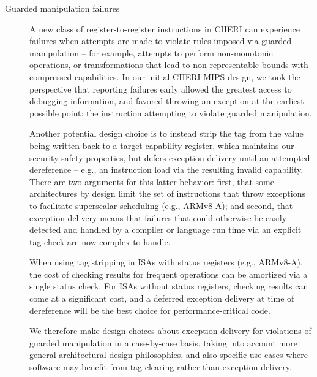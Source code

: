 \begin{description}
\item[Guarded manipulation failures]
  A new class of register-to-register instructions in CHERI can experience
  failures when attempts are made to violate rules imposed via guarded
  manipulation -- for example, attempts to perform non-monotonic operations, or
  transformations that lead to non-representable bounds with compressed
  capabilities.
  In our initial CHERI-MIPS design, we took the perspective that reporting
  failures early allowed the greatest access to debugging information, and
  favored throwing an exception at the earliest possible point: the
  instruction attempting to violate guarded manipulation.

  Another potential design choice is to instead strip the tag from the value
  being written back to a target capability register, which maintains our
  security safety properties, but defers exception delivery until an attempted
  dereference -- e.g., an instruction load via the resulting invalid
  capability.
  There are two arguments for this latter behavior: first, that some
  architectures by design limit the set of instructions that throw exceptions
  to facilitate superscalar scheduling (e.g., ARMv8-A); and second, that
  exception delivery means that failures that could otherwise be easily
  detected and handled by a compiler or language run time via an explicit tag
  check are now complex to handle.

  When using tag stripping in ISAs with status registers (e.g., ARMv8-A), the
  cost of checking results for frequent operations can be amortized via a
  single status check.
  For ISAs without status registers, checking results can come at a
  significant cost, and a deferred exception delivery at time of dereference
  will be the best choice for performance-critical code.

  We therefore make design choices about exception delivery for violations of
  guarded manipulation in a case-by-case basis, taking into account more
  general architectural design philosophies, and also specific use cases where
  software may benefit from tag clearing rather than exception delivery.
\end{description}

